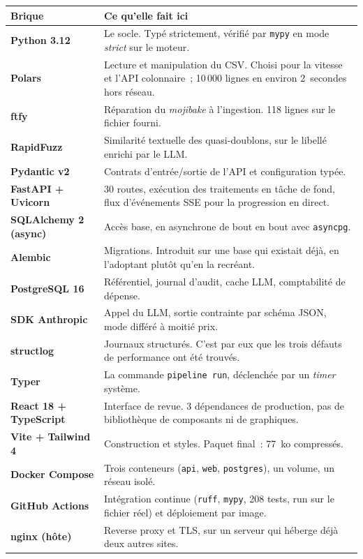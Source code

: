 \documentclass[11pt,a4paper]{article}
\newcommand{\code}[1]{\texttt{\small #1}}
\begin{document}
\renewcommand{\arraystretch}{1.24}
\noindent\begin{tabularx}{\linewidth}{@{}>{\raggedright\arraybackslash\bfseries}p{3.4cm} X@{}}
\toprule
\textbf{Brique} & \textbf{Ce qu'elle fait ici} \\
\midrule
Python 3.12 & Le socle. Typé strictement, vérifié par \code{mypy} en mode \emph{strict} sur le moteur. \\
Polars & Lecture et manipulation du CSV. Choisi pour la vitesse et l'API colonnaire~; 10\,000 lignes en environ 2~secondes hors réseau. \\
ftfy & Réparation du \emph{mojibake} à l'ingestion. 118 lignes sur le fichier fourni. \\
RapidFuzz & Similarité textuelle des quasi-doublons, sur le libellé enrichi par le LLM. \\
Pydantic v2 & Contrats d'entrée/sortie de l'API et configuration typée. \\
FastAPI + Uvicorn & 30 routes, exécution des traitements en tâche de fond, flux d'événements SSE pour la progression en direct. \\
SQLAlchemy 2 (async) & Accès base, en asynchrone de bout en bout avec \code{asyncpg}. \\
Alembic & Migrations. Introduit sur une base qui existait déjà, en l'adoptant plutôt qu'en la recréant. \\
PostgreSQL 16 & Référentiel, journal d'audit, cache LLM, comptabilité de dépense. \\
SDK Anthropic & Appel du LLM, sortie contrainte par schéma JSON, mode différé à moitié prix. \\
structlog & Journaux structurés. C'est par eux que les trois défauts de performance ont été trouvés. \\
Typer & La commande \code{pipeline run}, déclenchée par un \emph{timer} système. \\
React 18 + TypeScript & Interface de revue. 3 dépendances de production, pas de bibliothèque de composants ni de graphiques. \\
Vite + Tailwind 4 & Construction et styles. Paquet final~: 77~ko compressés. \\
Docker Compose & Trois conteneurs (\code{api}, \code{web}, \code{postgres}), un volume, un réseau isolé. \\
GitHub Actions & Intégration continue (\code{ruff}, \code{mypy}, 208 tests, run sur le fichier réel) et déploiement par image. \\
nginx (hôte) & Reverse proxy et TLS, sur un serveur qui héberge déjà deux autres sites. \\
\bottomrule
\end{tabularx}
\end{document}

